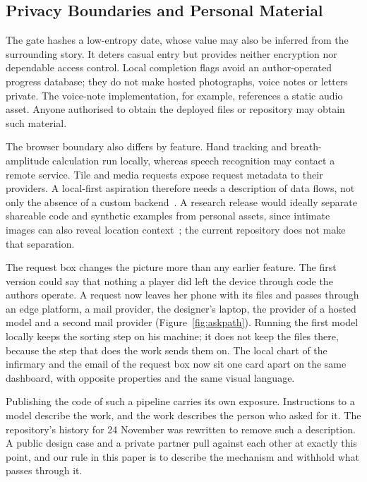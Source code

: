 \documentclass[sigconf,nonacm]{acmart}
\begin{document}
\subsection{Privacy Boundaries and Personal Material}\label{sec:privacy}
The gate hashes a low-entropy date, whose value may also be inferred from the surrounding story.
It deters casual entry but provides neither encryption nor dependable access control. Local
completion flags avoid an author-operated progress database; they do not make hosted photographs,
voice notes or letters private. The voice-note implementation, for example, references a static
audio asset. Anyone authorised to obtain the deployed files or repository may obtain such material.

The browser boundary also differs by feature. Hand tracking and breath-amplitude calculation
run locally, whereas speech recognition may contact a remote service. Tile and media requests
expose request metadata to their providers. A local-first aspiration therefore needs a description
of data flows, not only the absence of a custom backend~\cite{kleppmann2019localfirst}.
A research release would ideally separate shareable code and synthetic examples from personal
assets, since intimate images can also reveal location context~\cite{yang2024geolocator}; the
current repository does not make that separation.

The request box changes the picture more than any earlier feature. The first version could say
that nothing a player did left the device through code the authors operate. A request now
leaves her phone with its files and passes through an edge platform, a mail provider, the
designer's laptop, the provider of a hosted model and a second mail provider
(Figure~\ref{fig:askpath}). Running the first model locally keeps the sorting step on his
machine; it does not keep the files there, because the step that does the work sends them on.
The local chart of the infirmary and the email of the request box now sit one card apart on
the same dashboard, with opposite properties and the same visual language.

Publishing the code of such a pipeline carries its own exposure. Instructions to a model
describe the work, and the work describes the person who asked for it. The repository's history
for 24 November was rewritten to remove such a description. A public design case and a private
partner pull against each other at exactly this point, and our rule in this paper is to describe
the mechanism and withhold what passes through it.
\end{document}
